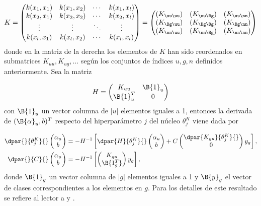 \begin{align}
  K = \begin{pmatrix} k(x_1,x_1) & k(x_1,x_2) & \cdots & k(x_1,x_l)
    \\ k(x_2,x_1) & k(x_2,x_2) & \cdots & k(x_2,x_l) \\ \vdots &
    \vdots & \ddots & \vdots \\ k(x_l,x_1) & k(x_l,x_2) & \cdots &
    k(x_l,x_l)
  \end{pmatrix}
  =
  \begin{pmatrix}
    (K_{\uu\uu}) & (K_{\uu\Bg}) & (K_{\uu\nn}) \\
    (K_{\Bg\uu}) & (K_{\Bg\Bg}) & (K_{\Bg\nn}) \\
    (K_{\nn\uu}) & (K_{\nn\Bg}) & (K_{\nn\nn})
  \end{pmatrix}
\end{align}
donde en la matriz de la derecha los elementos de $K$ han sido
reordenados en submatrices $K_{uu},K_{ug},\ldots$ según los conjuntos
de índices $u, g, n$ definidos anteriormente.  Sea la matriz

\begin{align}
  H=\begin{pmatrix} K_{uu} & \B{1}_u \\ \B{1}_u^T & 0
  \end{pmatrix}
\end{align}
con $\B{1}_u$ un vector columna de $|u|$ elementos iguales a 1,
entonces la derivada de $(\B{\alpha}_u,b)^T$ respecto del
hiperparámetro $j$ del núcleo $\theta^K_j$ viene dada por

\begin{align}
  \dpar{}{\theta^K_j}{} \begin{pmatrix}\alpha_{u}\\b\end{pmatrix} &=
    -H^{-1} \left[
      \dpar{H}{\theta^K_j}{}
      \begin{pmatrix}\alpha_{u}\\b\end{pmatrix}
        +C \begin{pmatrix}\dpar{K_{gu}}{\theta^K_j}{}\\0\end{pmatrix}
          y_g
          \right], \\
  \dpar{}{C}{} \begin{pmatrix}\alpha_{u}\\b\end{pmatrix} &=
    -H^{-1} \left[
      \begin{pmatrix}{K_{gu}}\\\B{1_g^T}\end{pmatrix} y_g
      \right],
\end{align}
donde $\B{1}_g$ un vector columna de $|g|$ elementos iguales a 1 y
$\B{y}_g$ el vector de clases correspondientes a los elementos en
$g$. Para los detalles de este resultado se refiere al lector a
\cite{glasmachers} y \cite{keerthi}.


